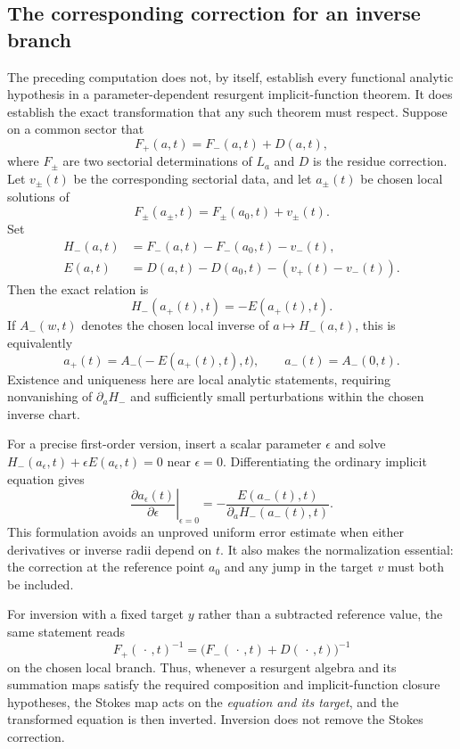 \subsection{The corresponding correction for an inverse branch}

The preceding computation does not, by itself, establish every functional
analytic hypothesis in a parameter-dependent resurgent implicit-function
theorem.  It does establish the exact transformation that any such
theorem must respect.  Suppose on a common sector that
\[
 F_+(a,t)=F_-(a,t)+D(a,t),
\]
where $F_\pm$ are two sectorial determinations of $L_a$ and $D$ is the
residue correction.  Let $v_\pm(t)$ be the corresponding sectorial data,
and let $a_\pm(t)$ be chosen local solutions of
\[
 F_\pm(a_\pm,t)=F_\pm(a_0,t)+v_\pm(t).
\]
Set
\begin{align*}
 H_-(a,t)&=F_-(a,t)-F_-(a_0,t)-v_-(t),\\
 E(a,t)&=D(a,t)-D(a_0,t)-(v_+(t)-v_-(t)).
\end{align*}
Then the exact relation is
\begin{equation}
 H_-(a_+(t),t)=-E(a_+(t),t).
 \label{eq:cb-inverse-exact}
\end{equation}
If $A_-(w,t)$ denotes the chosen local inverse of $a\mapsto H_-(a,t)$,
this is equivalently
\begin{equation}
 a_+(t)=A_-\bigl(-E(a_+(t),t),t\bigr),
 \qquad a_-(t)=A_-(0,t).
 \label{eq:cb-inverse-map}
\end{equation}
Existence and uniqueness here are local analytic statements, requiring
nonvanishing of $\partial_aH_-$ and sufficiently small perturbations
within the chosen inverse chart.

For a precise first-order version, insert a scalar parameter $\epsilon$
and solve $H_-(a_\epsilon,t)+\epsilon E(a_\epsilon,t)=0$ near
$\epsilon=0$.  Differentiating the ordinary implicit equation gives
\begin{equation}
 \left.\frac{\partial a_\epsilon(t)}{\partial\epsilon}
 \right|_{\epsilon=0}
 =-\frac{E(a_-(t),t)}{\partial_aH_-(a_-(t),t)}.
 \label{eq:cb-inverse-first-jump}
\end{equation}
This formulation avoids an unproved uniform error estimate when either
derivatives or inverse radii depend on $t$.  It also makes the
normalization essential: the correction at the reference point $a_0$
and any jump in the target $v$ must both be included.

For inversion with a fixed target $y$ rather than a subtracted reference
value, the same statement reads
\[
 F_+(\,\cdot\,,t)^{-1}
   =\bigl(F_-(\,\cdot\,,t)+D(\,\cdot\,,t)\bigr)^{-1}
\]
on the chosen local branch.  Thus, whenever a resurgent algebra and its
summation maps satisfy the required composition and implicit-function
closure hypotheses, the Stokes map acts on the \emph{equation and its
target}, and the transformed equation is then inverted.  Inversion does
not remove the Stokes correction.

